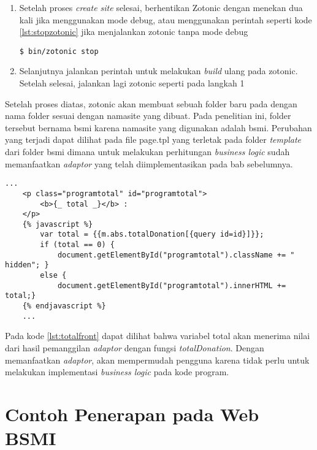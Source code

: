 \begin{enumerate}
	\item Setelah proses \textit{create site} selesai, berhentikan Zotonic dengan menekan  dua kali jika menggunakan mode debug, atau menggunakan perintah seperti kode \ref{lst:stopzotonic} jika menjalankan zotonic tanpa mode debug
	\begin{minipage}{\linewidth}
		\begin{lstlisting}[caption={Perintah untuk memberhentikan zotonic},label={lst:stopzotonic}]
		$ bin/zotonic stop
		\end{lstlisting}
	\end{minipage}

	\item Selanjutnya jalankan perintah  untuk melakukan \textit{build} ulang pada zotonic. Setelah selesai, jalankan lagi zotonic seperti pada langkah 1
	
\end{enumerate}

Setelah proses diatas, zotonic akan membuat sebuah folder baru pada  dengan nama folder sesuai dengan namasite yang dibuat. Pada penelitian ini, folder tersebut bernama bsmi karena namasite yang digunakan adalah bsmi. Perubahan yang terjadi dapat dilihat pada file page.tpl yang terletak pada folder \textit{template} dari folder bsmi dimana untuk melakukan perhitungan \textit{business logic} sudah memanfaatkan \textit{adaptor} yang telah diimplementasikan pada bab sebelumnya.
\begin{minipage}{\linewidth}
	\begin{lstlisting}[caption={\textit{Business logic} untuk fungsi total pada kategori program},label={lst:totalfront}]
	...
	<p class="programtotal" id="programtotal">
		<b>{_ total _}</b> : 
	</p>
	{% javascript %} 
		var total = {{m.abs.totalDonation[{query id=id}]}}; 
		if (total == 0) {
			document.getElementById("programtotal").className += " hidden"; } 
		else { 
			document.getElementById("programtotal").innerHTML += total;}
	{% endjavascript %}
	...
	\end{lstlisting}
\end{minipage}

Pada kode \ref{lst:totalfront} dapat dilihat bahwa variabel total akan menerima nilai dari hasil pemanggilan \textit{adaptor} dengan fungsi \textit{totalDonation}. Dengan memanfaatkan \textit{adaptor}, akan mempermudah pengguna karena tidak perlu untuk melakukan implementasi \textit{business logic} pada kode program.
\section{Contoh Penerapan pada Web BSMI}
